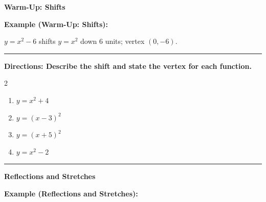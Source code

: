 \documentclass[12pt]{article}
\begin{document}
\vspace{0.35cm}

\begin{center}{\Large \textbf{Warm-Up: Shifts}}\end{center}\vspace{0.2cm}
\textbf{Example (Warm-Up: Shifts):}

$y=x^2-6$ shifts $y=x^2$ down 6 units; vertex $(0,-6)$.

\vspace{0.2cm}\hrule\vspace{0.35cm}
\textbf{Directions: Describe the shift and state the vertex for each function.}

\begin{multicols}{2}
\begin{enumerate}[label=\textbf{\arabic*.}, start=1, itemsep=1.3cm]
  \item $\displaystyle y=x^2+4$
  \item $\displaystyle y=(x-3)^2$
  \item $\displaystyle y=(x+5)^2$
  \item $\displaystyle y=x^2-2$
\end{enumerate}
\end{multicols}
\vspace{0.25cm}\hrule\vspace{0.35cm}

\begin{center}{\Large \textbf{Reflections and Stretches}}\end{center}\vspace{0.2cm}
\textbf{Example (Reflections and Stretches):}
\end{document}
